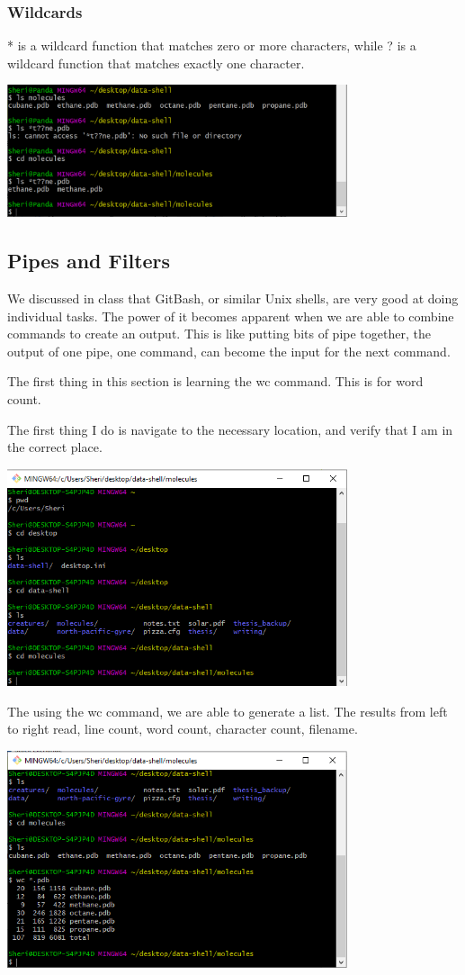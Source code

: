 \documentclass{article}
\begin{document}
\subsubsection{Wildcards}
* is a wildcard function that matches zero or more characters, while ? is a wildcard function that matches exactly one character.

\includegraphics[width=10cm]{Images/GitBash_027.PNG}

\subsection{Pipes and Filters}
We discussed in class that GitBash, or similar Unix shells, are very good at doing individual tasks. The power of it becomes apparent when we are able to combine commands to create an output. This is like putting bits of pipe together, the output of one pipe, one command, can become the input for the next command. 

The first thing in this section is learning the wc command. This is for word count.

The first thing I do is navigate to the necessary location, and verify that I am in the correct place.

\includegraphics[width=10cm]{Images/GitBash_028.PNG}

The using the wc command, we are able to generate a list. The results from left to right read, line count, word count, character count, filename.

\includegraphics[width=10cm]{Images/GitBash_029.PNG}
\end{document}
